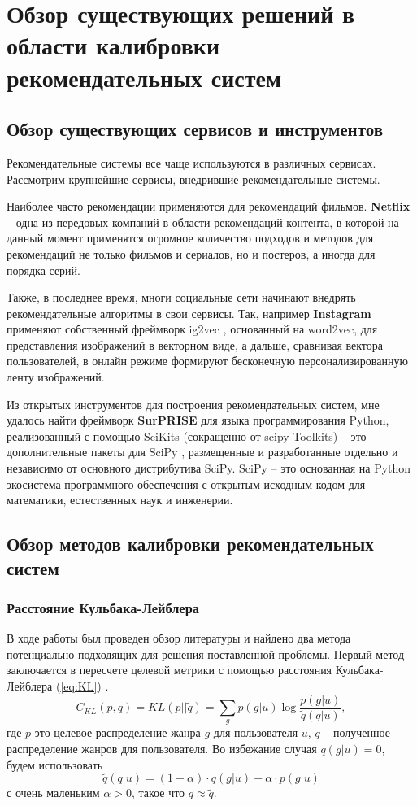 \section{Обзор существующих решений в области калибровки рекомендательных систем}
\subsection{Обзор существующих сервисов и инструментов}
Рекомендательные системы все чаще используются в различных сервисах. 
Рассмотрим крупнейшие сервисы, внедрившие рекомендательные
системы.

Наиболее часто рекомендации применяются для рекомендаций фильмов. 
\textbf{Netflix} -- одна из передовых компаний в области рекомендаций контента,
в которой на данный момент применятся огромное количество подходов и методов
для рекомендаций не только фильмов и сериалов, но и постеров, а иногда
для порядка серий.


  Также, в последнее время, многи социальные сети начинают внедрять
  рекомендательные алгоритмы в свои сервисы. Так, например \textbf{Instagram}
  применяют собственный фреймворк ig2vec \cite{ig2vec}, основанный на 
  word2vec, для представления изображений в векторном виде, а дальше, 
  сравнивая вектора пользователей, в онлайн режиме формируют бесконечную
  персонализированную ленту изображений.

  Из открытых инструментов для построения рекомендательных систем, мне
  удалось найти фреймворк \textbf{SurPRISE} \cite{sur} для языка программирования Python, 
  реализованный с помощью SciKits \cite{SciKits} (сокращенно от scipy Toolkits) -- 
  это дополнительные пакеты для SciPy \cite{Scipy}, размещенные и разработанные 
  отдельно и независимо от основного дистрибутива SciPy. SciPy -- 
  это основанная на Python экосистема программного обеспечения с 
  открытым исходным кодом для математики, естественных наук и 
  инженерии.

\subsection{Обзор методов калибровки рекомендательных систем}
\subsubsection{Расстояние Кульбака-Лейблера}
В ходе работы был проведен обзор литературы и найдено два 
метода потенциально подходящих для решения поставленной проблемы. 
Первый метод заключается в пересчете целевой метрики с помощью 
расстояния Кульбака-Лейблера (\ref{eq:KL}) \cite{bib4}.
\begin{equation}
  C_{KL}(p,q) = KL(p||\tilde{q}) = \sum_g p(g|u)\log\frac{p(g|u)}{\tilde{q}(q|u)},
  \label{eq:KL}
\end{equation}
где ${p}$ это целевое распределение жанра ${g}$ для пользователя 
$u$, $q$ -- полученное распределение жанров для пользователя.
Во избежание случая $q(g|u)=0$, будем использовать 
\begin{equation}
  \tilde{q}(q|u) = (1-\alpha) \cdot q(g|u) + \alpha \cdot p(g|u)
\end{equation} с очень маленьким $\alpha>0$, такое что $q\approx\tilde{q}$.


